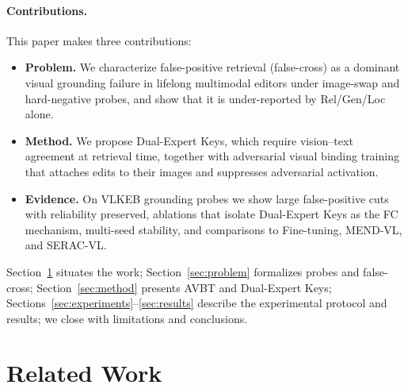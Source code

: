 \documentclass[letterpaper]{article} %
\begin{document}
\paragraph{Contributions.}
This paper makes three contributions:
\begin{itemize}
    \item \textbf{Problem.} We characterize false-positive retrieval (false-cross) as a dominant visual grounding failure in lifelong multimodal editors under image-swap and hard-negative probes, and show that it is under-reported by Rel/Gen/Loc alone.
    \item \textbf{Method.} We propose Dual-Expert Keys, which require vision--text agreement at retrieval time, together with adversarial visual binding training that attaches edits to their images and suppresses adversarial activation.
    \item \textbf{Evidence.} On VLKEB grounding probes we show large false-positive cuts with reliability preserved, ablations that isolate Dual-Expert Keys as the FC mechanism, multi-seed stability, and comparisons to Fine-tuning, MEND-VL, and SERAC-VL.
\end{itemize}

Section~\ref{sec:related} situates the work; Section~\ref{sec:problem} formalizes probes and false-cross; Section~\ref{sec:method} presents AVBT and Dual-Expert Keys; Sections~\ref{sec:experiments}--\ref{sec:results} describe the experimental protocol and results; we close with limitations and conclusions.

\section{Related Work}
\label{sec:related}
\end{document}
